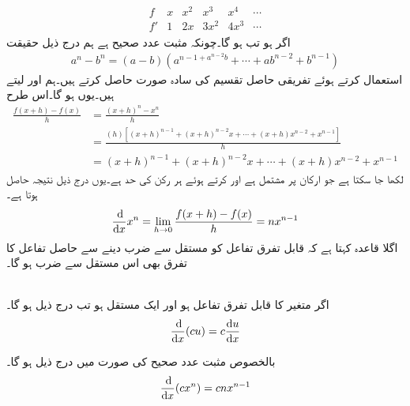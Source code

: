 \begin{align*}
\begin{array}{c|c|c|c|c|c}
f&x&x^2&x^3&x^4&\cdots\\
\hline
f'&1&2x&3x^2&4x^3&\cdots
\end{array}
\end{align*}
اگر  ہو تب  ہو گا۔چونکہ  مثبت عدد صحیح ہے ہم درج ذیل حقیقت 
\begin{align*}
a^n-b^n=(a-b)(a^{n-1+a^{n-2}b}+\cdots+ab^{n-2}+b^{n-1})
\end{align*}
استعمال کرتے ہوئے تفریقی حاصل تقسیم کی سادہ صورت حاصل کرتے ہیں۔ہم  اور  لیتے ہیں۔یوں  ہو گا۔اس طرح 
\begin{align*}
\frac{f(x+h)-f(x)}{h}&=\frac{(x+h)^n-x^n}{h}\\
&=\frac{(h)[(x+h)^{n-1}+(x+h)^{n-2}x+\cdots+(x+h)x^{n-2}+x^{n-1}]}{h}\\
&=(x+h)^{n-1}+(x+h)^{n-2}x+\cdots+(x+h)x^{n-2}+x^{n-1}
\end{align*}
لکھا جا سکتا ہے جو  ارکان پر مشتمل ہے اور   کرتے ہوئے ہر رکن کی حد  ہے۔یوں درج ذیل  نتیجہ حاصل ہوتا ہے۔ 
\begin{align*}
\frac{\dif}{\dif x}x^n=\lim_{h\to 0}\frac{f(x+h)-f(x)}{h}=nx^{n-1}
\end{align*}
اگلا قاعدہ کہتا ہے کہ قابل تفرق تفاعل کو مستقل سے ضرب دینے سے حاصل تفاعل کا تفرق بھی اس مستقل سے ضرب ہو گا۔

\\
اگر  متغیر  کا قابل تفرق تفاعل ہو اور  ایک مستقل ہو تب درج ذیل ہو گا۔
\begin{align*}
\frac{\dif}{\dif x} (cu)=c\frac{\dif u}{\dif x}
\end{align*}

بالخصوص مثبت عدد صحیح  کی صورت میں درج ذیل ہو گا۔
\begin{align*}
\frac{\dif}{\dif x} (cx^n)=cnx^{n-1}
\end{align*}

